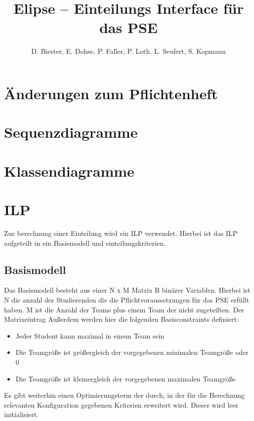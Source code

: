 \documentclass[parskip=full]{scrartcl}
\begin{document}
\title{Elipse -- Einteilungs Interface für das PSE}
\author{D. Biester, E. Dohse, P. Faller, P. Loth, L. Seufert, S. Kopmann}
\zweitgutachter{}

\tableofcontents
\pagebreak


\section{Änderungen zum Pflichtenheft}

\section{Sequenzdiagramme}

\section{Klassendiagramme}

\section{ILP}
Zur berechnung einer Einteilung wird ein ILP verwendet. Hierbei ist das ILP
aufgeteilt in ein Basismodell und einteilungskriterien.
\subsection{Basismodell}
Das Basismodell besteht aus einer N x M Matrix B binärer Variablen. Hierbei ist
N die anzahl der Studierenden die die Pflichtvoraussetzungen für das PSE erfüllt
haben. M ist die Anzahl der Teams plus einem Team
der nicht zugeteilten. Der Matrixeintrag
Außerdem werden hier die folgenden Basisconstraints definiert:


 \begin{itemize}
   \item Jeder Student kann maximal in einem Team sein
   \item Die Teamgröße ist größergleich der vorgegebenen minimalen Teamgröße
   oder 0
   \item Die Teamgröße ist kleinergleich der vorgegebenen maximalen Teamgröße
 \end{itemize}
 
 Es gibt weiterhin einen Optimierungsterm der durch, in der für die Berechnung
 relevanten Konfiguration gegebenen Kriterien erweitert wird. Dieser wird leer
 initialisiert.
\end{document}
